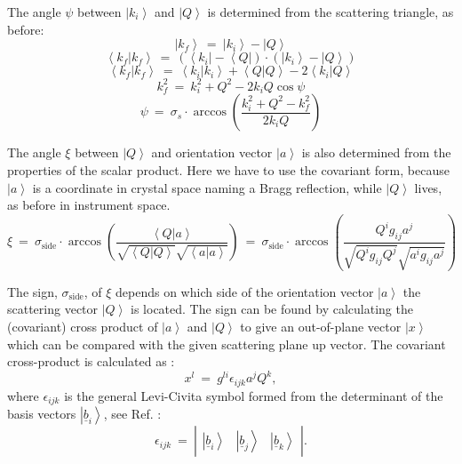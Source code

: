 The angle $\psi$ between $\left| k_i \right>$ and $\left| Q \right>$ is determined from the scattering triangle, as before:
\begin{equation}
	\left| k_f \right> \ =\  \left| k_i \right> - \left| Q \right> 
\end{equation}
\begin{equation} 
	\left< k_f | k_f \right> \ =\  \left( \left< k_i \right| - \left< Q \right| \right) \cdot \left( \left| k_i \right> - \left| Q \right> \right)
\end{equation}
\begin{equation}
	\left< k_f | k_f \right> \ =\  \left< k_i | k_i \right> + \left< Q | Q \right> - 2 \left< k_i | Q \right>
\end{equation}
\begin{equation}
	k_f^2 \ =\  k_i^2 + Q^2 - 2 k_i Q \cos \psi 
\end{equation}
\begin{equation}
	\boxed{ \psi \ =\  \sigma_s \cdot \arccos \left( \frac{k_i^2 + Q^2 - k_f^2}{2 k_i Q} \right) }
\end{equation}


\vspace{0.5cm}


The angle $\xi$ between $\left| Q \right>$ and orientation vector $\left| a \right>$ is also determined from the properties of the scalar product.
Here we have to use the covariant form, because $\left| a \right>$ is a coordinate in crystal space naming a Bragg reflection, while $\left| Q \right>$ lives, as before in instrument space.
\begin{equation} 
	\boxed{ \xi \ =\  
\sigma_{\mathrm{side}} \cdot \arccos \left( \frac{ \left< Q | a \right> }{ \sqrt{\left< Q | Q \right>} \sqrt{\left< a | a \right>} } \right) \ =\  
\sigma_{\mathrm{side}} \cdot \arccos \left( \frac{ Q^i g_{ij} a^j }{ \sqrt{Q^i g_{ij} Q^j} \sqrt{a^i g_{ij} a^j} } \right) } 
\label{eq:xi}
\end{equation}

The sign, $\sigma_{\mathrm{side}}$, of $\xi$ depends on which side of the orientation vector $\left| a \right>$ the scattering vector $\left| Q \right>$ is located. 
The sign can be found by calculating the (covariant) cross product of $\left| a \right>$ and $\left| Q \right>$ to give an out-of-plane vector $\left| x \right>$ which can be compared with the given scattering plane up vector.
The covariant cross-product is calculated as \cite[p. 815]{Arens2015}:
\begin{equation}
	x^l \ =\  g^{li} \epsilon_{ijk} a^j Q^k,
\end{equation}
where $\epsilon_{ijk}$ is the general Levi-Civita symbol formed from the determinant of the basis vectors $\left| \underline{b}_i \right>$, see Ref. \cite[p. 815]{Arens2015}:
\begin{equation}
	\epsilon_{ijk} \ =\  \left|
		\begin{array}{ccc} \left| 
			\underline{b}_i \right> & \left| \underline{b}_j \right> & \left| \underline{b}_k \right>
		\end{array} \right|.
\end{equation}




